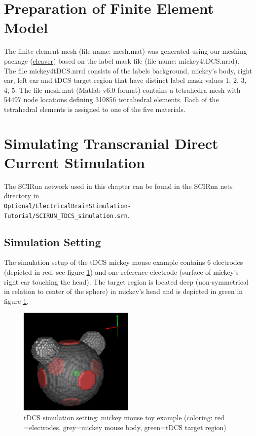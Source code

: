 \documentclass[fleqn,11pt,openany]{book}
\begin{document}
\section{Preparation of Finite Element Model}

The finite element mesh (file name: mesh.mat) was generated using our meshing package
(\href{http://www.sci.utah.edu/cibc-software/cleaver-cibc.html}{cleaver}) based on the label mask file (file name: mickey4tDCS.nrrd).
The file mickey4tDCS.nrrd consists of the labels background, mickey's body, right ear, left ear and tDCS target region that have distinct label mask values 1, 2, 3, 4, 5.
The file mesh.mat (Matlab v6.0 format) contains a tetrahedra mesh with 54497 node locations defining 310856 tetrahedral elements.
Each of the tetrahedral elements is assigned to one of the five materials.

\section{Simulating Transcranial Direct Current Stimulation}\label{sec:sim_tdcs}

The SCIRun network used in this chapter can be found in the SCIRun nets directory in \\
\texttt{Optional/ElectricalBrainStimulation-Tutorial/SCIRUN\_TDCS\_simulation.srn}.

\subsection{Simulation Setting}

The simulation setup of the tDCS mickey mouse example contains 6 electrodes (depicted in red, see figure \ref{fig:sim_setting}) and one reference electrode 
(surface of mickey's right ear touching the head).
The target region is located deep (non-symmetrical in relation to center of the sphere) in mickey's head and is depicted in green in figure \ref{fig:sim_setting}.

\begin{figure}[!h]
\centering
\includegraphics[width=0.5\textwidth]{ElectricalBrainStimulationTutorial_figures/sim_setting.png}
\caption{ tDCS simulation setting: mickey mouse toy example (coloring: red =electrodes, grey=mickey mouse body, green=tDCS target region)}
\label{fig:sim_setting}
\end{figure}
\end{document}
